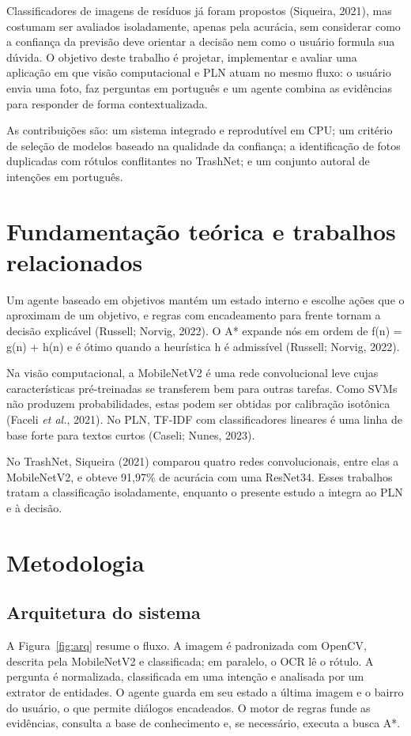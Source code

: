 \documentclass[12pt,a4paper]{article}
\begin{document}
Classificadores de imagens de resíduos já foram propostos (Siqueira, 2021), mas costumam ser avaliados isoladamente, apenas pela acurácia, sem considerar como a confiança da previsão deve orientar a decisão nem como o usuário formula sua dúvida. O objetivo deste trabalho é projetar, implementar e avaliar uma aplicação em que visão computacional e PLN atuam no mesmo fluxo: o usuário envia uma foto, faz perguntas em português e um agente combina as evidências para responder de forma contextualizada.

As contribuições são: um sistema integrado e reprodutível em CPU; um critério de seleção de modelos baseado na qualidade da confiança; a identificação de fotos duplicadas com rótulos conflitantes no TrashNet; e um conjunto autoral de intenções em português.

\section{Fundamentação teórica e trabalhos relacionados}
Um agente baseado em objetivos mantém um estado interno e escolhe ações que o aproximam de um objetivo, e regras com encadeamento para frente tornam a decisão explicável (Russell; Norvig, 2022). O A* expande nós em ordem de f(n) = g(n) + h(n) e é ótimo quando a heurística h é admissível (Russell; Norvig, 2022).

Na visão computacional, a MobileNetV2 é uma rede convolucional leve cujas características pré-treinadas se transferem bem para outras tarefas. Como SVMs não produzem probabilidades, estas podem ser obtidas por calibração isotônica (Faceli \textit{et al.}, 2021). No PLN, TF-IDF com classificadores lineares é uma linha de base forte para textos curtos (Caseli; Nunes, 2023).

No TrashNet, Siqueira (2021) comparou quatro redes convolucionais, entre elas a MobileNetV2, e obteve 91,97\% de acurácia com uma ResNet34. Esses trabalhos tratam a classificação isoladamente, enquanto o presente estudo a integra ao PLN e à decisão.

\section{Metodologia}
\subsection{Arquitetura do sistema}
A Figura~\ref{fig:arq} resume o fluxo. A imagem é padronizada com OpenCV, descrita pela MobileNetV2 e classificada; em paralelo, o OCR lê o rótulo. A pergunta é normalizada, classificada em uma intenção e analisada por um extrator de entidades. O agente guarda em seu estado a última imagem e o bairro do usuário, o que permite diálogos encadeados. O motor de regras funde as evidências, consulta a base de conhecimento e, se necessário, executa a busca A*.
\end{document}

